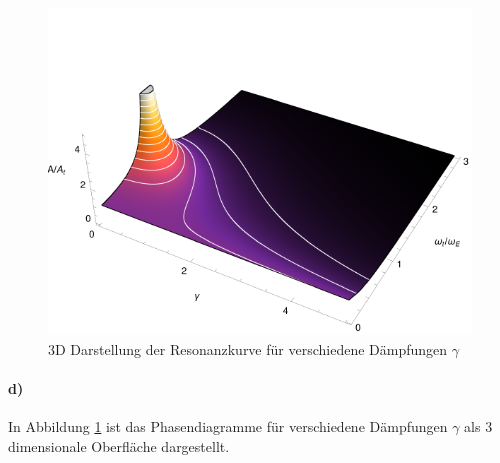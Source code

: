 \begin{figure}[p]
	\centering
	\includegraphics[width=400pt]{C_3D.pdf}
	\caption{3D Darstellung der Resonanzkurve für verschiedene Dämpfungen $\gamma$}
	\label{fig:3d}
\end{figure}
\paragraph*{d)}
In Abbildung \ref{fig:3d} ist das Phasendiagramme für verschiedene Dämpfungen $\gamma$ als 3 dimensionale Oberfläche dargestellt.

